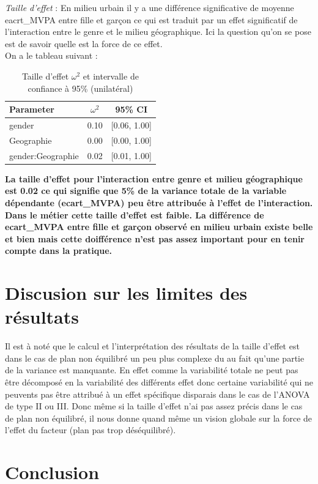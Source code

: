 \documentclass[12pt,a4paper]{article}
\begin{document}
	\textit{Taille d'effet} :
	En milieu urbain il y a une différence significative de moyenne eacrt\_MVPA entre fille et garçon ce qui est traduit par un effet significatif de l'interaction entre le genre et le milieu géographique. Ici la question qu'on se pose est de savoir quelle est la force de ce effet.\\
	On a le tableau suivant : 
	\begin{table}[H]
		\centering
		\begin{tabular}{|l|c|c|}
			\hline
			\textbf{Parameter} & \textbf{$\omega^2$} & \textbf{95\% CI} \\
			\hline
			gender             & 0.10                      & [0.06, 1.00]      \\
			Geographie         & 0.00                      & [0.00, 1.00]      \\
			gender:Geographie  & 0.02                      & [0.01, 1.00]      \\
			\hline
		\end{tabular}
		\caption{Taille d'effet $\omega^2$ et intervalle de confiance à 95\% (unilatéral)}
		\label{table:omega2}
	\end{table}
	\textbf{La taille d'effet pour l'interaction entre genre et milieu géographique est 0.02 ce qui signifie que 5\% de la variance totale de la variable dépendante (ecart\_MVPA) peu être attribuée à l'effet de l'interaction. Dans le métier cette taille d'effet est faible. La différence de ecart\_MVPA entre fille et garçon observé en milieu urbain existe belle et bien mais cette doifférence n'est pas assez important pour en tenir compte dans la pratique.}
	\section{Discusion sur les limites des résultats}
	Il est à noté que le calcul et l'interprétation des résultats de la taille d'effet est dans le cas de plan non équilibré un peu plus complexe du au fait qu'une partie de la variance est manquante. En effet comme la variabilité totale ne peut pas être décomposé en la variabilité des différents effet donc certaine variabilité qui ne peuvents pas être attribué à un effet spécifique disparais dans le cas de l'ANOVA de type II ou III. Donc même si la taille d'effet n'ai pas assez précis dans le cas de plan non équilibré, il nous donne quand même un vision globale sur la force de l'effet du facteur (plan pas trop déséquilibré).
	\section{Conclusion}
	
\end{document}
